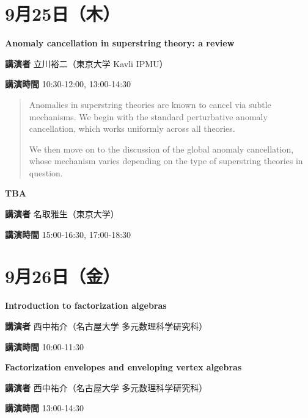 \documentclass{ltjsarticle}
\theoremstyle{mystyle} %
\numberwithin{equation}{section}
\newcommand{\spkC}{立川裕二}
\newcommand{\spkD}{名取雅生}
\newcommand{\spkE}{西中祐介}
\newcommand{\instC}{東京大学 Kavli IPMU}
\newcommand{\instD}{東京大学}
\newcommand{\instE}{名古屋大学 多元数理科学研究科}
\newcommand{\titleC}{Anomaly cancellation in superstring theory: a review}
\newcommand{\titleD}{TBA}
\newcommand{\titleE}{Introduction to factorization algebras}
\newcommand{\titleEE}{Factorization envelopes and enveloping vertex algebras}
\newcommand{\abst}[5]{
    \Large
    \textbf{#1}
    \normalsize
    
    \vspace{10pt}

    \textbf{講演者} #2（#3）

    \textbf{講演時間} #4

    \vspace{5pt}

    \begin{quote}
        #5
    \end{quote}

    \vspace{10pt}
}
\begin{document}
\newpage

\section*{9月25日（木）}

\abst{\titleC}{\spkC}{\instC}{10:30-12:00, 13:00-14:30}{
    \phantom{AA}Anomalies in superstring theories are known to cancel via subtle mechanisms. We begin with the standard perturbative anomaly cancellation, which works uniformly across all theories.
    
    \phantom{AA}We then move on to the discussion of the global anomaly cancellation, whose mechanism varies depending on the type of superstring theories in question.
}

\abst{\titleD}{\spkD}{\instD}{15:00-16:30, 17:00-18:30}{
}

\newpage

\section*{9月26日（金）}

\abst{\titleE}{\spkE}{\instE}{10:00-11:30}{
}

\abst{\titleEE}{\spkE}{\instE}{13:00-14:30}{
}
\end{document}
